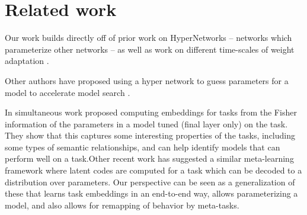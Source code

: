 \documentclass{article}
\begin{document}
\section{Related work}

Our work builds directly off of prior work on HyperNetworks \citep{Ha2016} -- networks which parameterize other networks -- as well as work on different time-scales of weight adaptation \citep{Hinton1982, Ba2016}. 

Other authors have proposed using a hyper network to guess parameters for a model to accelerate model search \citep[e.g.][]{Brock2018a}.

In simultaneous work \citet{Achille2019} proposed computing embeddings for tasks from the Fisher information of the parameters in a model tuned (final layer only) on the task. They show that this captures some interesting properties of the tasks, including some types of semantic relationships, and can help identify models that can perform well on a task.Other recent work has suggested a similar meta-learning framework where latent codes are computed for a task which can be decoded to a distribution over parameters. Our perspective can be seen as a generalization of these that learns task embeddings in an end-to-end way, allows parameterizing a model, and also allows for remapping of behavior by meta-tasks.
\end{document}
